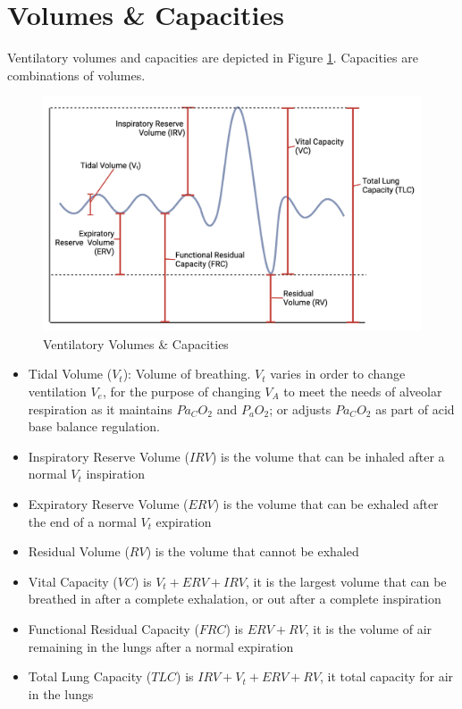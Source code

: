 \section{Volumes \& Capacities}

Ventilatory volumes and capacities are depicted in Figure \ref{fig:ventilation_volumes}. Capacities are combinations of volumes.

\begin{figure}[!h]
    \centering
    \includegraphics[width=0.75 \linewidth]{./figure/ventilation/ventilation_volumes.png}
    \caption{Ventilatory Volumes \& Capacities}
    \label{fig:ventilation_volumes}
\end{figure}

\begin{itemize}
    \item Tidal Volume ($V_t$): Volume of breathing. $V_t$ varies in order to change ventilation $V_e$, for the purpose of changing $V_A$ to meet the needs of alveolar respiration as it maintains $Pa_CO_2$ and $P_aO_2$; or adjusts $Pa_CO_2$ as part of acid base balance regulation.
    \item Inspiratory Reserve Volume ($IRV$) is the volume that can be inhaled after a normal $V_t$ inspiration
    \item Expiratory Reserve Volume ($ERV$) is the volume that can be exhaled after the end of a normal $V_t$ expiration
    \item Residual Volume ($RV$) is the volume that cannot be exhaled
    \item Vital Capacity ($VC$) is $V_t + ERV + IRV$, it is the largest volume that can be breathed in after a complete exhalation, or out after a complete inspiration
    \item Functional Residual Capacity ($FRC$) is $ERV + RV$, it is the volume of air remaining in the lungs after a normal expiration
    \item Total Lung Capacity ($TLC$) is $IRV + V_t + ERV + RV$, it total capacity for air in the lungs
\end{itemize}

